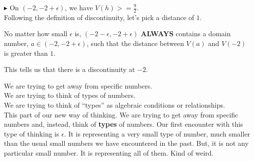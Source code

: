 \documentclass{ximera}
\begin{document}
\begin{explanation}
\textbf{\textcolor{red!90!darkgray}{$\blacktriangleright$}} On $(-2, -2 + \epsilon)$, we have $V(h) >=  \frac{9}{2}$. \\




Following the definition of discontinuity, let's pick a distance of $1$.


No matter how small $\epsilon$ is, $(-2 - \epsilon, -2 + \epsilon)$ \textbf{\textcolor{red!90!darkgray}{ALWAYS}} contains a domain number, $a \in (-2, -2 + \epsilon)$, such that the distance between $V(a)$ and $V(-2)$ is greater than $1$.

This tells us that there is a discontinuity at $-2$.

\end{explanation}








\begin{idea}


We are trying to get away from specific numbers. \\

We are trying to think of types of numbers. \\

We are trying to think of ``types'' as algebraic conditions or relationships. \\


This part of our new way of thinking.  We are trying to get away from specific numbers and, instead, think of \textbf{types} of numbers.  Our first encounter with this type of thinking is $\epsilon$.  It is representing a very small type of number, much smaller than the usual small numbers we have encountered in the past.  But, it is not any particular small number.  It is representing all of them. Kind of weird.



\end{idea}
\end{document}
